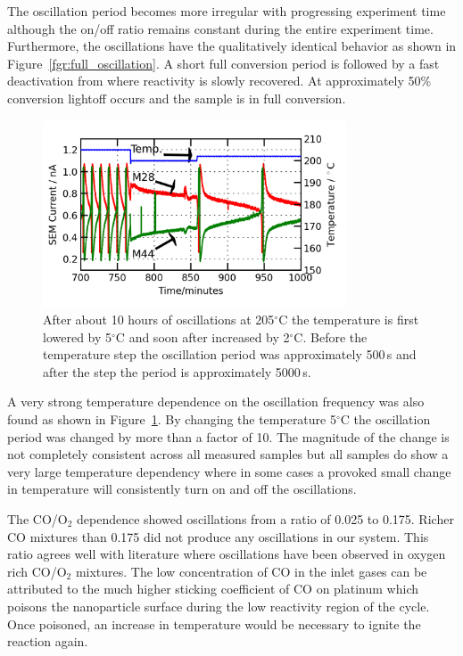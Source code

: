 \documentclass[8.5pt,twoside,twocolumn]{article}
\begin{document}
The oscillation period becomes more irregular with progressing experiment time although the on/off ratio remains constant during the entire experiment time. Furthermore, the oscillations have the qualitatively identical behavior as shown in Figure~\ref{fgr:full_oscillation}. A short full conversion period is followed by a fast deactivation from where reactivity is slowly recovered. At approximately 50\% conversion lightoff occurs and the sample is in full conversion.

\begin{figure}[h]
\centering
  \includegraphics[width=9cm]{temperature_dependence.png}
  \caption{After about 10 hours of oscillations at 205$^\circ$C the temperature is first lowered by 5$^\circ$C and soon after increased by 2$^\circ$C. Before the temperature step the oscillation period was approximately 500\,s and after the step the period is approximately 5000\,s.}
  \label{fgr:temperature_dependence}
\end{figure}
A very strong temperature dependence on the oscillation frequency was also found as shown in Figure~\ref{fgr:temperature_dependence}. By changing the temperature 5$^\circ$C the oscillation period was changed by more than a factor of 10. The magnitude of the change is not completely consistent across all measured samples but all samples do show a very large temperature dependency where in some cases a provoked small change in temperature will consistently turn on and off the oscillations.

The CO/O$_2$ dependence showed oscillations from a ratio of 0.025 to 0.175. Richer CO mixtures than 0.175 did not produce any oscillations in our system. This ratio agrees well with literature \cite{Singh2010,Hendriksen2005} where oscillations have been observed in oxygen rich CO/O$_2$ mixtures. The low concentration of CO in the inlet gases can be attributed to the much higher sticking coefficient of CO on platinum which poisons the nanoparticle surface during the low reactivity region of the cycle. Once poisoned, an increase in temperature would be necessary to ignite the reaction again.
\end{document}
